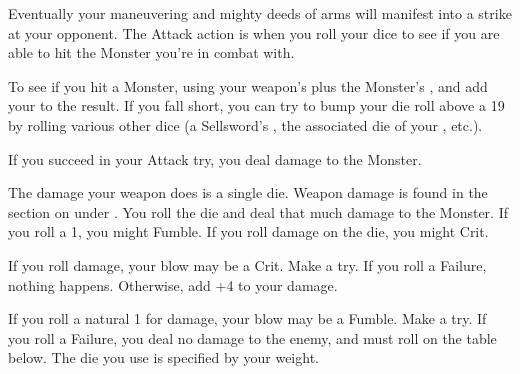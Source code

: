 \begin{multicols*}{2}
\cbreak





  Eventually your maneuvering and mighty deeds of arms will manifest into a strike at your opponent. The Attack action is when you roll your dice to see if you are able to hit the Monster you're in combat with.

  To see if you hit a Monster, \RO using your weapon's  plus the Monster's , and add your \LVL to the result. If you fall short, you can try to bump your die roll above a 19 by rolling various other dice (a Sellsword's , the associated die of your , etc.).

  If you succeed in your Attack try, you deal damage to the Monster.

\end{multicols*}


  The damage your weapon does is a single die. Weapon damage is found in the section on  under .  You roll the die and deal that much damage to the Monster.  If you roll a 1, you might Fumble.  If you roll \MAX damage on the die, you might Crit.




  If you roll \MAX damage, your blow may be a Crit. Make a \RSTRY{\FOC} try.  If you roll a Failure, nothing happens. Otherwise, add +4 to your damage.

  If you roll a natural 1 for damage, your blow may be a Fumble. Make a \RSTRY{\FOC} try. If you roll a Failure, you deal no damage to the enemy, and must roll on the table below. The die you use is specified by your  weight.




